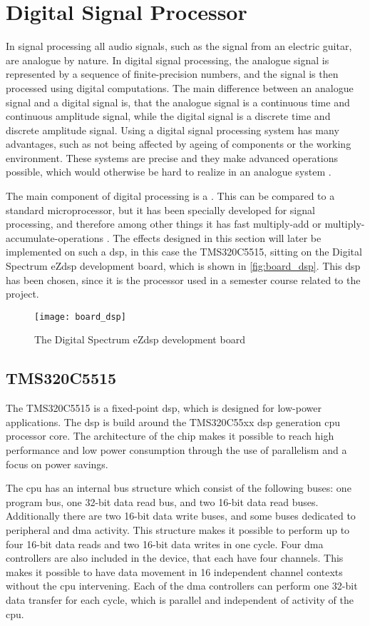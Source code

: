 \section{Digital Signal Processor}\label{sec:dsp_board}
In signal processing all audio signals, such as the signal from an electric guitar, are analogue by nature. In digital signal processing, the analogue signal is represented by a sequence of finite-precision numbers, and the signal is then processed using digital computations. The main difference between an analogue signal and a digital signal is, that the analogue signal is a continuous time and continuous amplitude signal, while the digital signal is a discrete time and discrete amplitude signal. 
Using a digital signal processing system has many advantages, such as not being affected by ageing of components or the working environment. These systems are precise and they make advanced operations possible, which would otherwise be hard to realize in an analogue system \citep{kuulusa}. 

The main component of digital processing is a . This can be compared to a standard microprocessor, but it has been specially developed for signal processing, and therefore among other things it has fast multiply-add or multiply-accumulate-operations \citep{kuulusa}. The effects designed in this section will later be implemented on such a \gls{dsp}, in this case the TMS320C5515, sitting on the Digital Spectrum eZdsp development board, which is shown in \autoref{fig:board_dsp}. This \gls{dsp} has been chosen, since it is the processor used in a semester course related to the project.

\begin{figure}[H]
	\centering
	\texttt{[image: board\_dsp]}
	\caption{The Digital Spectrum eZdsp development board}
	\label{fig:board_dsp}
\end{figure}


\subsection{TMS320C5515}
The TMS320C5515 is a fixed-point \gls{dsp}, which is designed for low-power applications. The \gls{dsp} is build around the TMS320C55xx \gls{dsp} generation \gls{cpu} processor core. The architecture of the chip makes it possible to reach high performance and low power consumption through the use of parallelism and a focus on power savings. 

The \gls{cpu} has an internal bus structure which consist of the following buses: one program bus, one 32-bit data read bus, and two 16-bit data read buses. Additionally there are two 16-bit data write buses, and some buses dedicated to peripheral and \gls{dma} activity. This structure makes it possible to perform up to four 16-bit data reads and two 16-bit data writes in one cycle. Four \gls{dma} controllers are also included in the device, that each have four channels. This makes it possible to have data movement in 16 independent channel contexts without the \gls{cpu} intervening. Each of the \gls{dma} controllers can perform one 32-bit data transfer for each cycle, which is parallel and independent of activity of the \gls{cpu}.

